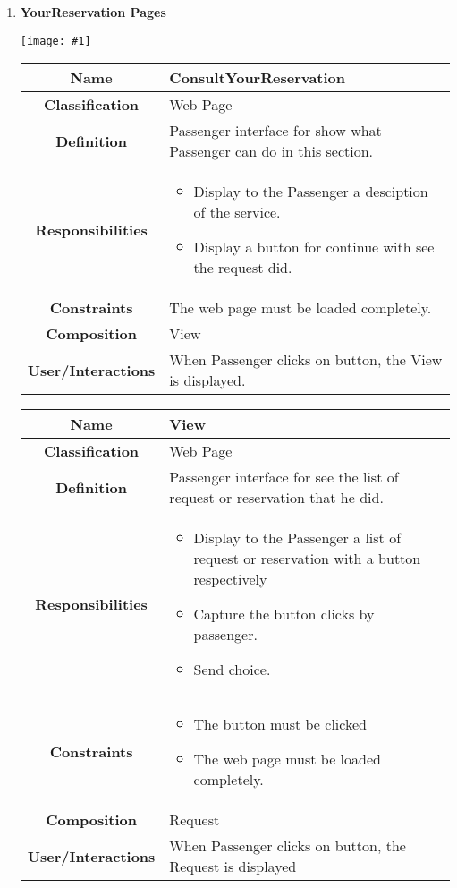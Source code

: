 \documentclass[11pt, a4paper,titlepage]{article}
\newcommand{\image}[1]{
	\begin{center}
		\noindent \texttt{[image: \#1]}
	\end{center}
	}
\begin{document}
\begin{enumerate}
\newpage
\item \textbf{YourReservation Pages}\\
\image{page_yourreservation.png}
\begin{tabularx}{\textwidth}{| c | X |}
	\hline
	\textbf{Name} & 
	ConsultYourReservation
	\\
	\hline
	\textbf{Classification} & 
	Web Page
	\\
	\hline
	\textbf{Definition} & 
	Passenger interface for show what Passenger can do in this section.\\
	\hline
	\textbf{Responsibilities} &
	\begin{itemize}
		\item Display to the Passenger a desciption of the service.
		\item Display a button for continue with see the request did.
	\end{itemize}
	\\
	\hline
	\textbf{Constraints} & The web page must be loaded completely.
	\\
	\hline
	\textbf{Composition} & 
	View
	\\
	\hline
	\textbf{User/Interactions} & 
	When Passenger clicks on button, the View is displayed.
	\\
	\hline	
\end{tabularx}

\begin{tabularx}{\textwidth}{| c | X |}
	\hline
	\textbf{Name} & 
	View
	\\
	\hline
	\textbf{Classification} & 
	Web Page
	\\
	\hline
	\textbf{Definition} & 
	Passenger interface for see the list of request or reservation that he did.
	\\
	\hline
	\textbf{Responsibilities} &
		\begin{itemize}
			\item Display to the Passenger a list of request or reservation with a button respectively
			\item Capture the button clicks by passenger.    
			\item Send choice.
		\end{itemize}
	\\
	\hline
	\textbf{Constraints} & 
		\begin{itemize}
			\item The button must be clicked
			\item The web page must be loaded completely.
		\end{itemize}
	\\
	\hline
	\textbf{Composition} & 
	Request
	\\
	\hline
	\textbf{User/Interactions} & 
	When Passenger clicks on button, the Request is displayed
	\\
	\hline	
\end{tabularx}


\end{enumerate}
\end{document}
